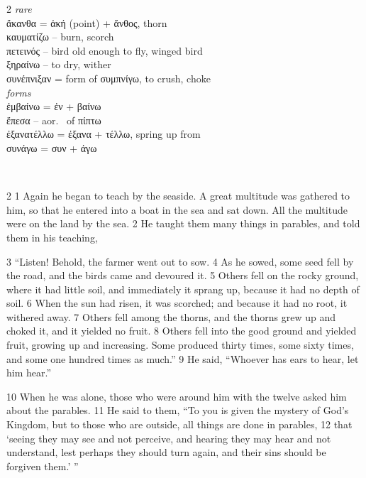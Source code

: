 \documentclass[10pt,a5paper,twoside,twocolumn]{book}
\newcommand*\cleartoleftpage{%
  \ifodd\value{page}\hbox{}\clearpage\fi
}
\newcommand{\separator}{
  \vspace{-0.5\baselineskip}%
  \hspace{0.27\textwidth}%
  \noindent\makebox[\linewidth]{\resizebox{0.3333\linewidth}{1pt}{$\bullet$}}\bigskip%
  \vspace{-0.5\baselineskip}
}
\newenvironment{facing}{\cleartoleftpage}{\clearpage\pagebreak}
\newenvironment{help}{\clearpage}{}
\newenvironment{helpsec}{\begin{minipage}[t]{\textwidth}\begin{multicols}{2}}{\end{multicols}\end{minipage}}
\newenvironment{vocab}{\begin{helpsec}}{\end{helpsec}}
\newenvironment{translation}{\separator\\\begin{helpsec}\footnotesize}{\end{helpsec}}
\begin{document}
\begin{facing}
\begin{help}
\begin{vocab}
\emph{rare}\\
ἄκανθα = ἀκή (point) + ἄνθος, thorn\\
καυματίζω -- burn, scorch\\
πετεινός -- bird old enough to fly, winged bird\\
ξηραίνω -- to dry, wither\\
συνέπνιξαν = form of συμπνίγω, to crush, choke\\

\emph{forms}\\
ἐμβαίνω = ἐν + βαίνω\\
ἔπεσα -- aor.~ of πίπτω\\
ἐξανατέλλω = ἐξανα + τέλλω, spring up from\\
συνάγω = συν + άγω\\

\end{vocab}
\begin{translation}
 1 Again he began to teach by the seaside. A great multitude was gathered to him, so that he entered into a boat in the sea and sat down. All the multitude were on the land by the sea. 2 He taught them many things in parables, and told them in his teaching, 

3  ``Listen! Behold, the farmer went out to sow. 4  As he sowed, some seed fell by the road, and the birds came and devoured it. 5  Others fell on the rocky ground, where it had little soil, and immediately it sprang up, because it had no depth of soil. 6  When the sun had risen, it was scorched; and because it had no root, it withered away. 7  Others fell among the thorns, and the thorns grew up and choked it, and it yielded no fruit. 8  Others fell into the good ground and yielded fruit, growing up and increasing. Some produced thirty times, some sixty times, and some one hundred times as much.'' 9 He said, ``Whoever has ears to hear, let him hear.''

10 When he was alone, those who were around him with the twelve asked him about the parables. 11 He said to them, ``To you is given the mystery of God's Kingdom, but to those who are outside, all things are done in parables, 12  that `seeing they may see and not perceive, and hearing they may hear and not understand, lest perhaps they should turn again, and their sins should be forgiven them.' ''
\end{translation}
\end{help}
\end{facing}

\end{document}
